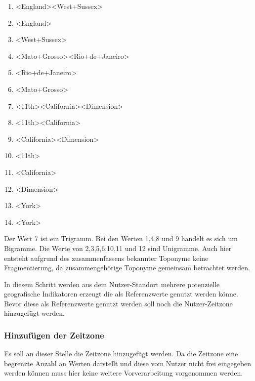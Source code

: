 				\begin{multicols}{2}
					\begin{enumerate}
						\item \textless England\textgreater   \textless West+Sussex\textgreater  
						\item \textless England\textgreater  
						\item \textless West+Sussex\textgreater  
						\item \textless Mato+Grosso\textgreater   \textless Rio+de+Janeiro\textgreater  
						\item \textless Rio+de+Janeiro\textgreater  
						\item \textless Mato+Grosso\textgreater  
						\item \textless 11th\textgreater   \textless California\textgreater   \textless Dimension\textgreater   
						\item \textless 11th\textgreater   \textless California\textgreater  
						\item \textless California\textgreater   \textless Dimension\textgreater   
						\item \textless 11th\textgreater  
						\item \textless California\textgreater  
						\item \textless Dimension\textgreater   
						\item \textless York\textgreater  
						\item \textless York\textgreater  
					\end{enumerate}
				\end{multicols}
				Der Wert 7 ist ein Trigramm.
				Bei den Werten 1,4,8 und 9 handelt es sich um Bigramme. 
				Die Werte von 2,3,5,6,10,11 und 12 sind Unigramme.				
				Auch hier entsteht aufgrund des zusammenfassens bekannter Toponyme keine Fragmentierung, da zusammengehörige Toponyme gemeinsam betrachtet werden.

				In diesem Schritt werden aus dem Nutzer-Standort mehrere potenzielle geografische Indikatoren erzeugt die als Referenzwerte genutzt werden könne.
				Bevor diese als Referenzwerte genutzt werden soll noch die Nutzer-Zeitzone hinzugefügt werden.

			\subsubsection{Hinzufügen der Zeitzone}

				Es soll an dieser Stelle die Zeitzone hinzugefügt werden.
				Da die Zeitzone eine begrenzte Anzahl an Werten darstellt und diese vom Nutzer nicht frei eingegeben werden können muss hier keine weitere Vorverarbeitung vorgenommen werden.

